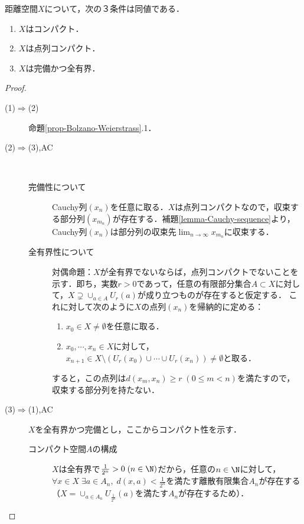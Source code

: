 \documentclass[uplatex,dvipdfmx]{jsreport}
\begin{document}
\begin{theorem}[AC]\label{thm-characterization-of-compact-metric-space}
    距離空間$X$について，次の３条件は同値である．
    \begin{enumerate}
        \item $X$はコンパクト．
        \item $X$は点列コンパクト．
        \item $X$は完備かつ全有界．
    \end{enumerate}
\end{theorem}
\begin{proof}\mbox{}
    \begin{description}
        \item[(1)$\Rightarrow$(2)] 
        命題\ref{prop-Bolzano-Weierstrass}.1．
        \item[(2)$\Rightarrow$(3),AC] \mbox{}\\
        \begin{description}
            \item[完備性について] 
            Cauchy列$(x_n)$を任意に取る．$X$は点列コンパクトなので，収束する部分列$(x_{m_n})$が存在する．補題\ref{lemma-Cauchy-sequence}より，Cauchy列$(x_n)$は部分列の収束先$\lim_{n\to\infty}x_{m_n}$に収束する．
            \item[全有界性について] 
            対偶命題：$X$が全有界でないならば，点列コンパクトでないことを示す．即ち，実数$r>0$であって，任意の有限部分集合$A\subset X$に対して，$X\supsetneq\cup_{a\in A}U_r(a)$が成り立つものが存在すると仮定する．
            これに対して次のように$X$の点列$(x_n)$を帰納的に定める：
            \begin{enumerate}
                \item $x_0\in X\ne\emptyset$を任意に取る．
                \item $x_0,\cdots,x_n\in X$に対して，$x_{n+1}\in X\setminus(U_r(x_0)\cup\cdots\cup U_r(x_n))\ne\emptyset$と取る．
            \end{enumerate}
        すると，この点列は$d(x_m,x_n)\ge r\;(0\le m<n)$を満たすので，収束する部分列を持たない．
        \end{description}
        \item[(3)$\Rightarrow$(1),AC] $X$を全有界かつ完備とし，ここからコンパクト性を示す．
        \begin{description}
            \item[コンパクト空間$A$の構成] 
            $X$は全有界で$\frac{1}{2^n}>0\;(n\in\N)$だから，任意の$n\in\N$に対して，$\forall x\in X\;\exists a\in A_n,\; d(x,a)<\frac{1}{2^n}$を満たす離散有限集合$A_n$が存在する（$X=\cup_{a\in A_n}U_{\frac{1}{2^n}}(a)$を満たす$A_n$が存在するため）．

\end{description}
\end{description}
\end{proof}
\end{document}
